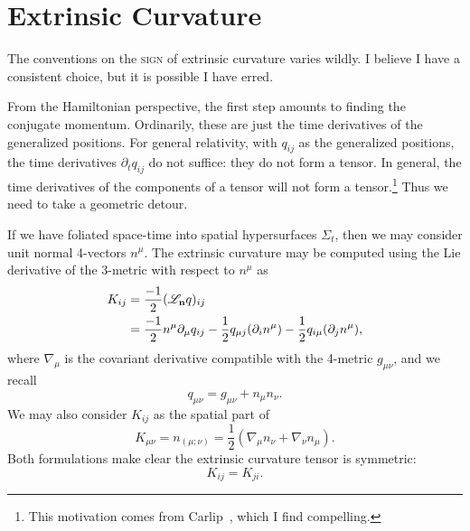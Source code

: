 \section{Extrinsic Curvature}

\begin{ddanger}
The conventions on the \textsc{sign} of extrinsic curvature varies wildly. I
believe I have a consistent choice, but it is possible I have erred.
\end{ddanger}

From the Hamiltonian perspective, the first step amounts to finding the
conjugate momentum. Ordinarily, these are just the time derivatives of
the generalized positions. For general relativity, with $q_{ij}$ as the
generalized positions, the time derivatives $\partial_{t}q_{ij}$ do not
suffice: they do not form a tensor. In general, the time derivatives of
the components of a tensor will not form a tensor.\footnote{This
motivation comes from Carlip~\cite{carlip2019}, which I find
compelling.} Thus we need to take a geometric detour.

If we have foliated space-time into spatial hypersurfaces $\Sigma_{t}$,
then we may consider unit normal 4-vectors $n^{\mu}$. The extrinsic
curvature may be computed using the Lie derivative of the 3-metric with
respect to $n^{\mu}$ as
\begin{equation}\label{eq:extrinsic-curvature:as-time-derivative-of-metric}
  \begin{split}
  K_{ij} &= \frac{-1}{2}(\mathscr{L}_{\mathbf{n}}q)_{ij}\\
  &= \frac{-1}{2}n^{\mu}\partial_{\mu}q_{ij} - \frac{1}{2} q_{\mu j}(\partial_{i}n^{\mu}) - \frac{1}{2} q_{i\mu}(\partial_{j}n^{\mu}),
  \end{split}
\end{equation}
where $\nabla_{\mu}$ is the covariant derivative compatible with the
4-metric $g_{\mu\nu}$, and we recall
\begin{equation}
q_{\mu\nu} = g_{\mu\nu} + n_{\mu}n_{\nu}.
\end{equation}
We may also consider $K_{ij}$ as the spatial  part of
\begin{equation}
K_{\mu\nu} = n_{(\mu;\nu)} = \frac{1}{2}(\nabla_{\mu}n_{\nu} + \nabla_{\nu}n_{\mu}).
\end{equation}
Both formulations make clear the extrinsic curvature tensor is
symmetric:
\begin{equation}
K_{ij} = K_{ji}.
\end{equation}

